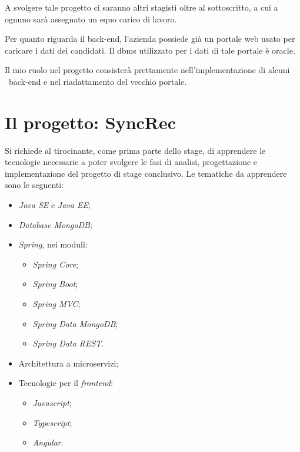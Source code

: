 A svolgere tale progetto ci saranno altri stagisti oltre al sottoscritto, a cui a ognuno sarà assegnato un equo carico di lavoro.

Per quanto riguarda il back-end, l'azienda possiede già un portale web usato per caricare i dati dei candidati. Il \gls{dbms} utilizzato per i dati di tale portale è \gls{oracle}.

Il mio ruolo nel progetto consisterà prettamente nell'implementazione di alcuni \gloss\ back-end e nel riadattamento del vecchio portale.


\section{Il progetto: SyncRec}

Si richiede al tirocinante, come prima parte dello stage, di apprendere le tecnologie necessarie a poter svolgere le fasi di analisi, progettazione e implementazione del progetto di stage conclusivo.
Le tematiche da apprendere sono le seguenti:
\begin{itemize}
	\item \textit{Java SE} e \textit{Java EE};
	\item \textit{Database MongoDB};
	\item \textit{Spring}, nei moduli:
	\begin{itemize}[noitemsep]
		\item \textit{Spring Core};
		\item \textit{Spring Boot};
		\item \textit{Spring MVC};
		\item \textit{Spring Data MongoDB};
		\item \textit{Spring Data REST}.
	\end{itemize}
	\item Architettura a microservizi;
	\item Tecnologie per il \textit{frontend}:
	\begin{itemize}[noitemsep]
		\item \textit{Javascript};
		\item \textit{Typescript};
		\item \textit{Angular}.
	\end{itemize}
\end{itemize}

